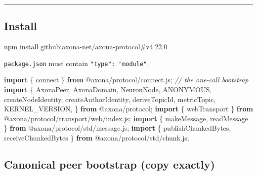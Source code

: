 \documentclass[
  nobib]{tufte-handout}
\newenvironment{Shaded}{}{}
\newcommand{\CommentTok}[1]{\textcolor[rgb]{0.38,0.63,0.69}{\textit{#1}}}
\newcommand{\ExtensionTok}[1]{#1}
\newcommand{\ImportTok}[1]{\textcolor[rgb]{0.00,0.50,0.00}{\textbf{#1}}}
\newcommand{\NormalTok}[1]{#1}
\newcommand{\OperatorTok}[1]{\textcolor[rgb]{0.40,0.40,0.40}{#1}}
\newcommand{\StringTok}[1]{\textcolor[rgb]{0.25,0.44,0.63}{#1}}
\begin{document}
\begin{center}\rule{0.5\linewidth}{0.5pt}\end{center}

\subsection{Install}\label{install}

\begin{Shaded}
\begin{Highlighting}[]
\ExtensionTok{npm}\NormalTok{ install github:axona{-}net/axona{-}protocol\#v4.22.0}
\end{Highlighting}
\end{Shaded}

\texttt{package.json} must contain \texttt{"type":\ "module"}.

\begin{Shaded}
\begin{Highlighting}[]
\ImportTok{import}\NormalTok{ \{ connect \} }\ImportTok{from} \StringTok{\textquotesingle{}@axona/protocol/connect.js\textquotesingle{}}\OperatorTok{;}   \CommentTok{// the one{-}call bootstrap}
\ImportTok{import}\NormalTok{ \{}
\NormalTok{  AxonaPeer}\OperatorTok{,}\NormalTok{ AxonaDomain}\OperatorTok{,}\NormalTok{ NeuronNode}\OperatorTok{,}\NormalTok{ ANONYMOUS}\OperatorTok{,}
\NormalTok{  createNodeIdentity}\OperatorTok{,}\NormalTok{ createAuthorIdentity}\OperatorTok{,}
\NormalTok{  deriveTopicId}\OperatorTok{,}\NormalTok{ metricTopic}\OperatorTok{,}\NormalTok{ KERNEL\_VERSION}\OperatorTok{,}
\NormalTok{\} }\ImportTok{from} \StringTok{\textquotesingle{}@axona/protocol\textquotesingle{}}\OperatorTok{;}
\ImportTok{import}\NormalTok{ \{ webTransport \} }\ImportTok{from} \StringTok{\textquotesingle{}@axona/protocol/transport/web/index.js\textquotesingle{}}\OperatorTok{;}
\ImportTok{import}\NormalTok{ \{ makeMessage}\OperatorTok{,}\NormalTok{ readMessage \} }\ImportTok{from} \StringTok{\textquotesingle{}@axona/protocol/std/message.js\textquotesingle{}}\OperatorTok{;}
\ImportTok{import}\NormalTok{ \{ publishChunkedBytes}\OperatorTok{,}\NormalTok{ receiveChunkedBytes \} }\ImportTok{from} \StringTok{\textquotesingle{}@axona/protocol/std/chunk.js\textquotesingle{}}\OperatorTok{;}
\end{Highlighting}
\end{Shaded}

\subsection{Canonical peer bootstrap (copy
exactly)}\label{canonical-peer-bootstrap-copy-exactly}
\end{document}
